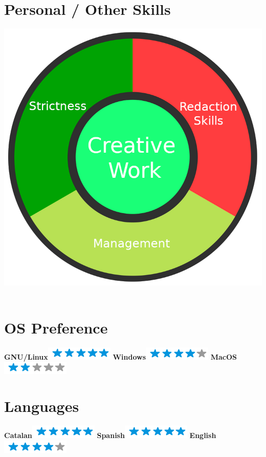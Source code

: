 \documentclass[]{friggeri-cv}
\begin{document}
\begin{aside}
    \section{Personal / Other Skills}
    \includegraphics[scale=0.20]{img/personal.png}
    ~
  \section{OS Preference}
    \textbf{GNU/Linux}\includegraphics[scale=0.40]{img/5stars.png}
    \textbf{Windows}\includegraphics[scale=0.40]{img/4stars.png}
    \textbf{MacOS}\includegraphics[scale=0.40]{img/2stars.png}
    ~
    \section{Languages}
    \textbf{Catalan}\includegraphics[scale=0.40]{img/5stars.png}
    \textbf{Spanish}\includegraphics[scale=0.40]{img/5stars.png}
    \textbf{English}\includegraphics[scale=0.40]{img/4stars.png}
    ~
\end{aside}
\end{document}
